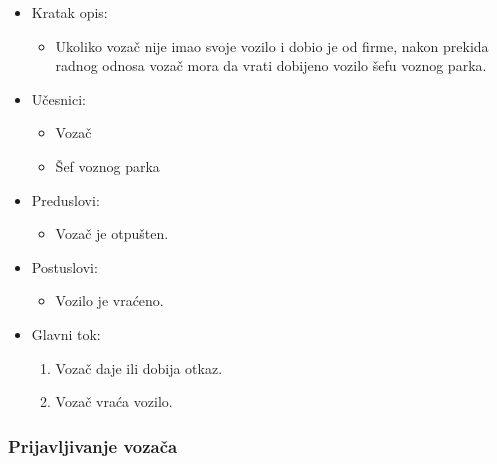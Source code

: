 \begin{itemize}
	\item Kratak opis:
		\begin{itemize}
			\item Ukoliko vozač nije imao svoje vozilo i dobio je od firme, nakon prekida radnog odnosa vozač mora da vrati dobijeno vozilo šefu voznog parka.
		\end{itemize}
	\item Učesnici:
		\begin{itemize}
		    \item Vozač
		    \item Šef voznog parka
		\end{itemize}
	\item Preduslovi:
		\begin{itemize}
		    \item Vozač je otpušten.
		\end{itemize}
	\item Postuslovi:
		\begin{itemize}
			\item Vozilo je vraćeno.
	    \end{itemize}
	\item Glavni tok:
		\begin{enumerate}
		    \item Vozač daje ili dobija otkaz.
		    \item Vozač vraća vozilo.
		\end{enumerate}
\end{itemize}


\subsubsection{\bfseries Prijavljivanje vozača}

